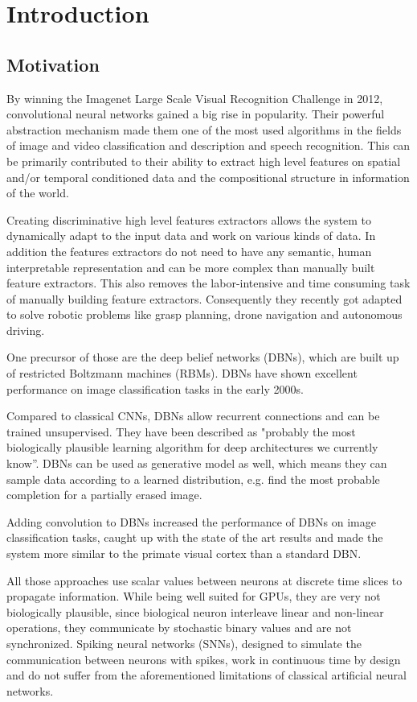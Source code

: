 \chapter{Introduction}

\section{Motivation}

By winning the Imagenet Large Scale Visual Recognition Challenge in 2012, convolutional neural networks gained a big rise in popularity. 
Their powerful abstraction mechanism made them one of the most used algorithms in the fields of image and video classification and description and speech recognition. 
This can be primarily contributed to their ability to extract high level features on spatial and/or temporal conditioned data and the compositional structure in information of the world.

Creating discriminative high level features extractors allows the system to dynamically adapt to the input data and work on various kinds of data. 
In addition the features extractors do not need to have any semantic, human interpretable representation and can be more complex than manually built feature extractors. 
This also removes the labor-intensive and time consuming task of manually building feature extractors.
Consequently they recently got adapted to solve robotic problems like grasp planning, drone navigation and autonomous driving. 

One precursor of those are the deep belief networks (DBNs), which are built up of restricted Boltzmann machines (RBMs). 
DBNs have shown excellent performance on image classification tasks in the early 2000s.

Compared to classical CNNs, DBNs allow recurrent connections and can be trained unsupervised. 
They have been described as  "probably the most biologically plausible learning algorithm for deep architectures we currently know”. 
DBNs can be used as generative model as well, which means they can sample data according to a learned distribution, e.g. find the most probable completion for a partially erased image.

Adding convolution to DBNs increased the performance of DBNs on image classification tasks, caught up with the state of the art results and made the system more similar to the primate visual cortex than a standard DBN. 

All those approaches use scalar values between neurons at discrete time slices to propagate information. 
While being well suited for GPUs, they are very not biologically plausible, since biological neuron interleave linear and non-linear operations, they communicate by stochastic binary values and are not synchronized. 
Spiking neural networks (SNNs), designed to simulate the communication between neurons with spikes, work in continuous time by design and do not suffer from the aforementioned limitations of classical artificial neural networks.

